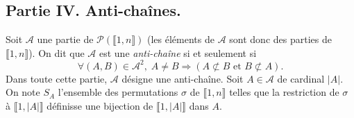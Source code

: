 \subsection*{Partie IV. Anti-chaînes.}
Soit $\mathcal{A}$ une partie de $\mathcal{P}(\llbracket 1,n \rrbracket)$ (les éléments de $\mathcal{A}$ sont donc des parties de $\llbracket 1,n \rrbracket$). On dit que $\mathcal{A}$ est une \emph{anti-chaîne} si et seulement si
\[
 \forall (A,B)\in \mathcal{A}^2, \; A\neq B \Rightarrow \left( A \not \subset B \text{ et } B \not \subset A\right) .
\]
Dans toute cette partie, $\mathcal{A}$ désigne une anti-chaîne.
Soit $A \in \mathcal{A}$ de cardinal $|A|$. On note $S_A$ l'ensemble des permutations $\sigma$ de $\llbracket 1, n\rrbracket$ telles  que la restriction de $\sigma$ à $\llbracket 1, |A|\rrbracket$ définisse une bijection de $\llbracket 1, |A|\rrbracket$ dans $A$. 

